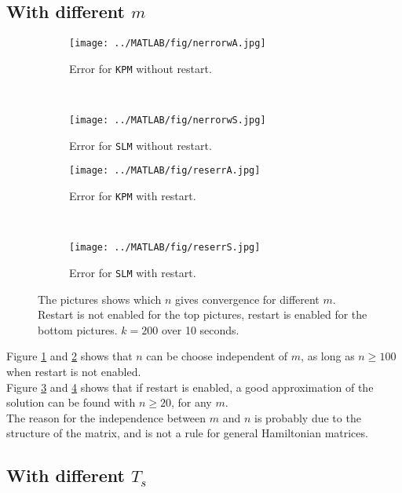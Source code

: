 \subsection{With different $m$} %
\begin{figure}[H]
        \centering
        \begin{subfigure}[b]{0.3\textwidth}
                \texttt{[image: ../MATLAB/fig/nerrorwA.jpg]}
                \caption{ Error for \texttt{KPM} without restart. }
                \label{fig:nerrorwA}
        \end{subfigure}
        ~
        \begin{subfigure}[b]{0.3\textwidth}
                \texttt{[image: ../MATLAB/fig/nerrorwS.jpg]}
                \caption{ Error for \texttt{SLM} without restart. }
                \label{fig:nerrorwS}
        \end{subfigure}
        
		\begin{subfigure}[b]{0.3\textwidth}
                \texttt{[image: ../MATLAB/fig/reserrA.jpg]}
                \caption{ Error for \texttt{KPM} with restart. }
                \label{fig:reserrA}
        \end{subfigure}
		~
		\begin{subfigure}[b]{0.3\textwidth}
                \texttt{[image: ../MATLAB/fig/reserrS.jpg]}
                \caption{ Error for \texttt{SLM} with restart. }
                \label{fig:reseneS}
        \end{subfigure}
        \caption{ The pictures shows which $n$ gives convergence for different $m$. Restart is not enabled for the top pictures, restart is enabled for the bottom pictures. $k = 200$ over 10 seconds. }
        \label{fig:n}
\end{figure}
Figure \ref{fig:nerrorwA} and \ref{fig:nerrorwS} shows that $n$ can be choose independent of $m$, as long as $n \geq 100$ when restart is not enabled. \\
Figure \ref{fig:reserrA} and \ref{fig:reseneS} shows that if restart is enabled, a good approximation of the solution can be found with $n \geq 20$, for any $m$.\\
The reason for the independence between $m$ and $n$ is probably due to the structure of the matrix, and is not a rule for general Hamiltonian matrices.

\subsection{With different $T_s$} %

